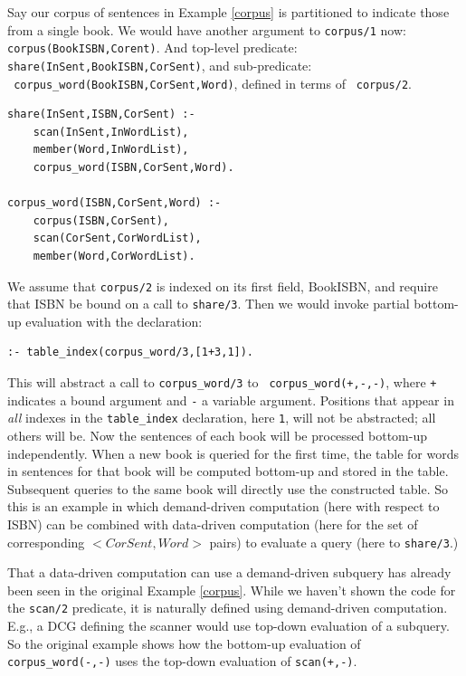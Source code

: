 \begin{example}
Say our corpus of sentences in Example \ref{corpus} is
partitioned to indicate those from a single book.  We would have
another argument to {\tt corpus/1} now: \\
{\tt corpus(BookISBN,Corent)}.  And top-level predicate: \\
{\tt share(InSent,BookISBN,CorSent)}, and sub-predicate: \\ {\tt
  corpus\_word(BookISBN,CorSent,Word)}, defined in terms of {\tt
  corpus/2}.

\footnotesize
\begin{verbatim}
share(InSent,ISBN,CorSent) :-
    scan(InSent,InWordList),
    member(Word,InWordList),
    corpus_word(ISBN,CorSent,Word).
    
corpus_word(ISBN,CorSent,Word) :-
    corpus(ISBN,CorSent),
    scan(CorSent,CorWordList),
    member(Word,CorWordList).
\end{verbatim}
\normalsize

We assume that {\tt corpus/2} is indexed on its first field, BookISBN,
and require that ISBN be bound on a call to {\tt share/3}.  Then we
would invoke partial bottom-up evaluation with the declaration:

\begin{verbatim}
:- table_index(corpus_word/3,[1+3,1]).
\end{verbatim}

\noindent
This will abstract a call to {\tt corpus\_word/3} to {\tt
  corpus\_word(+,-,-)}, where {\tt +} indicates a bound argument and
{\tt -} a variable argument.  Positions that appear in {\em all} indexes
in the {\tt table\_index} declaration, here {\tt 1}, will not be
abstracted; all others will be.  Now the sentences of each book will
be processed bottom-up independently.  When a new book is queried for
the first time, the table for words in sentences for that book will be
computed bottom-up and stored in the table.  Subsequent queries to the
same book will directly use the constructed table.  So this is an
example in which demand-driven computation (here with respect to ISBN)
can be combined with data-driven computation (here for the set of
corresponding $<CorSent,Word>$ pairs) to evaluate a query (here to
{\tt share/3}.)
\end{example}

That a data-driven computation can use a demand-driven subquery has
already been seen in the original Example \ref{corpus}.  While we
haven't shown the code for the {\tt scan/2} predicate, it is naturally
defined using demand-driven computation.  E.g., a DCG defining the
scanner would use top-down evaluation of a subquery.  So the original
example shows how the bottom-up evaluation of {\tt corpus\_word(-,-)}
uses the top-down evaluation of {\tt scan(+,-)}.

